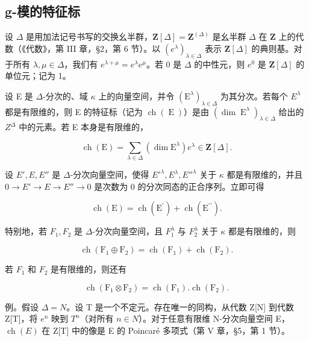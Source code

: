 \subsection{g-模的特征标}

设 \(\Delta\) 是用加法记号书写的交换幺半群，\(\mathbf{Z}[\Delta] = \mathbf{Z}^{(\Delta)}\) 是幺半群 \(\Delta\) 在 \(\mathbf{Z}\) 上的代数（《代数》，第 III 章，§2，第 6 节）。以 \((e^{\lambda})_{\lambda \in \Delta}\) 表示 \(\mathbf{Z}[\Delta]\) 的典则基。对于所有 \(\lambda, \mu \in \Delta\)，我们有 \(e^{\lambda + \mu} = e^{\lambda}e^{\mu}\)。若 0 是 \(\Delta\) 的中性元，则 \(e^0\) 是 \(\mathbf{Z}[\Delta]\) 的单位元；记为 1。

设 E 是 \(\Delta\)-分次的、域 \(\kappa\) 上的向量空间，并令 \((\mathrm{E}^{\lambda})_{\lambda\in\Delta}\) 为其分次。若每个 \(E^{\lambda}\) 都是有限维的，则 E 的特征标（记为 \(\operatorname{ch}(\operatorname{E})\)）是由 \((\dim\operatorname{E}^{\lambda})_{\lambda\in\Delta}\) 给出的 \(Z^{\Delta}\) 中的元素。若 E 本身是有限维的，

\[
\operatorname{ch} (\mathrm{E}) = \sum_ {\lambda \in \Delta} (\dim \mathrm{E} ^ {\lambda}) e ^ {\lambda} \in \mathbf {Z} [ \Delta ].\tag{5}
\]

设 \(E', E, E''\) 是 \(\Delta\)-分次向量空间，使得 \(E'^{\lambda}, E^{\lambda}, E''^{\lambda}\) 关于 \(\kappa\) 都是有限维的，并且 \(0 \longrightarrow E' \longrightarrow E \longrightarrow E'' \longrightarrow 0\) 是次数为 0 的分次同态的正合序列。立即可得

\[
\operatorname{ch} (\mathrm{E}) = \operatorname{ch} (\mathrm{E} ^ {\prime}) + \operatorname{ch} (\mathrm{E} ^ {\prime \prime}).\tag{6}
\]

特别地，若 \(F_{1}, F_{2}\) 是 \(\Delta\)-分次向量空间，且 \(F_{1}^{\lambda}\) 与 \(F_{2}^{\lambda}\) 关于 \(\kappa\) 都是有限维的，则

\[
\operatorname{ch} \left(\mathrm{F} _ {1} \oplus \mathrm{F} _ {2}\right) = \operatorname{ch} \left(\mathrm{F} _ {1}\right) + \operatorname{ch} \left(\mathrm{F} _ {2}\right).\tag{7}
\]

若 \(F_{1}\) 和 \(F_{2}\) 是有限维的，则还有

\[
\operatorname{ch} \left(\mathrm{F} _ {1} \otimes \mathrm{F} _ {2}\right) = \operatorname{ch} \left(\mathrm{F} _ {1}\right). \operatorname{ch} \left(\mathrm{F} _ {2}\right).\tag{8}
\]

例。假设 \(\Delta = N\)。设 T 是一个不定元。存在唯一的同构，从代数 Z{[}N{]} 到代数 Z{[}T{]}，将 \(e^{n}\) 映到 \(T^{n}\)（对所有 \(n \in N\)）。对于任意有限维 N-分次向量空间 E，\(\operatorname{ch}(E)\) 在 Z{[}T{]} 中的像是 E 的 Poincaré 多项式（第 V 章，§5，第 1 节）。

